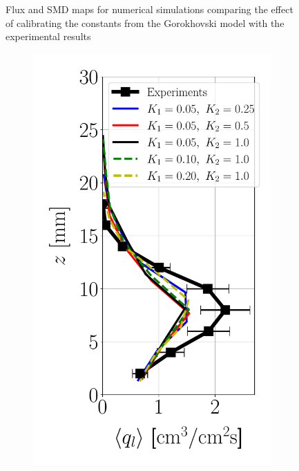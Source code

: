 \begin{figure}[t!]
\caption{Flux and SMD maps for numerical simulations comparing the effect of calibrating the constants from the Gorokhovski model with the experimental results}
\label{fig:maps_LGS_JICF_second_atom_apte_calibration}
\end{figure}


\clearpage


\begin{figure}[t!]
\flushleft
\begin{subfigure}[b]{0.2\textwidth}
	\flushleft
   \includegraphics[scale=0.35]{./part2_developments/figures_ch6_lagrangian_JICF/apte_model_calibration_u_vw_lognorm/profiles/flux_along_z}

\end{subfigure}
\end{figure}
